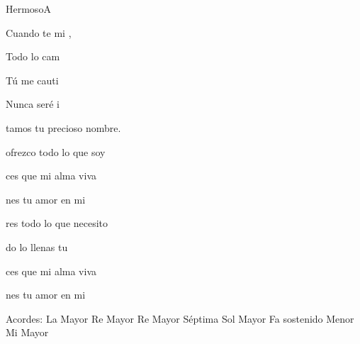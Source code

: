\documentclass[12pt, spanish]{book}
\begin{document}
\begin{song}{Hermoso}{A}
\begin{SBOpGroup}
            Cuando te mi  ,

            Todo lo cam

            Tú me cauti

            Nunca seré i
        \end{SBOpGroup}

        \begin{SBOpGroup}
            tamos tu precioso nombre.

             ofrezco todo lo que soy

            ces que mi alma viva

            nes tu amor en mi


            res todo lo que necesito

            do lo llenas tu

            ces que mi alma viva

            nes tu amor en mi
        \end{SBOpGroup}

        \ifChordBk
        \begin{SBOpGroup}
            Acordes:
            \upchord{\A}\qquad La Mayor \hfill
            \upchord{\D}\qquad Re Mayor \hfill\null\break
            \upchord{\Dseven}\qquad Re Mayor S\'eptima \hfill
            \upchord{\G}\qquad Sol Mayor \hfill\null\break
            \upchord{\Fsm}\qquad Fa sostenido Menor \hfill
            \upchord{\E}\qquad Mi Mayor \hfill\null\break
        \end{SBOpGroup}
        \fi
    \end{song}
\end{document}
